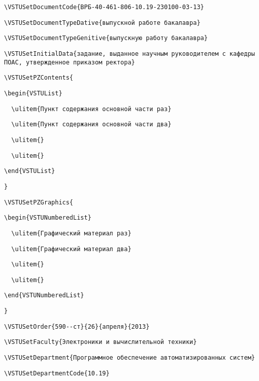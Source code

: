 \documentclass[a4paper,english]{G2-105}
\begin{document}
\texttt{\scriptsize{}\textbackslash{}VSTUSetDocumentCode\{ВРБ-40-461-806-10.19-230100-03-13\}}

\texttt{\scriptsize{}\textbackslash{}VSTUSetDocumentTypeDative\{выпускной работе бакалавра\}}

\texttt{\scriptsize{}\textbackslash{}VSTUSetDocumentTypeGenitive\{выпускную работу бакалавра\}}

\texttt{\scriptsize{}\textbackslash{}VSTUSetInitialData\{задание, выданное научным руководителем с кафедры ПОАС, утвержденное приказом ректора\}}

\texttt{\scriptsize{}\textbackslash{}VSTUSetPZContents\{}

\texttt{\scriptsize{}\textbackslash{}begin\{VSTUList\}}

\texttt{\scriptsize{}~~\textbackslash{}ulitem\{Пункт содержания основной части раз\}}

\texttt{\scriptsize{}~~\textbackslash{}ulitem\{Пункт содержания основной части два\}}

\texttt{\scriptsize{}~~\textbackslash{}ulitem\{\}}

\texttt{\scriptsize{}~~\textbackslash{}ulitem\{\}}

\texttt{\scriptsize{}\textbackslash{}end\{VSTUList\}}

\texttt{\scriptsize{}\}}

\texttt{\scriptsize{}\textbackslash{}VSTUSetPZGraphics\{}

\texttt{\scriptsize{}\textbackslash{}begin\{VSTUNumberedList\}}

\texttt{\scriptsize{}~~\textbackslash{}ulitem\{Графический материал раз\}}

\texttt{\scriptsize{}~~\textbackslash{}ulitem\{Графический материал два\}}

\texttt{\scriptsize{}~~\textbackslash{}ulitem\{\}}

\texttt{\scriptsize{}~~\textbackslash{}ulitem\{\}}

\texttt{\scriptsize{}\textbackslash{}end\{VSTUNumberedList\}}

\texttt{\scriptsize{}\}}

\texttt{\scriptsize{}\textbackslash{}VSTUSetOrder\{590-{}-ст\}\{26\}\{апреля\}\{2013\}}

\texttt{\scriptsize{}\textbackslash{}VSTUSetFaculty\{Электроники и вычислительной техники\}}

\texttt{\scriptsize{}\textbackslash{}VSTUSetDepartment\{Программное обеспечение автоматизированных систем\}}

\texttt{\scriptsize{}\textbackslash{}VSTUSetDepartmentCode\{10.19\}}
\end{document}
